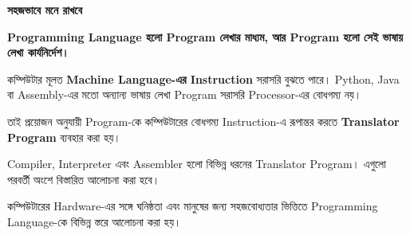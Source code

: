 \begin{rememberbox}

\textbf{\color{deepOrange}সহজভাবে মনে রাখবে}

\textbf{Programming Language হলো Program লেখার মাধ্যম, আর Program
হলো সেই ভাষায় লেখা কার্যনির্দেশ।}

\end{rememberbox}


কম্পিউটার মূলত \textbf{Machine Language-এর Instruction} সরাসরি
বুঝতে পারে। Python, Java বা Assembly-এর মতো অন্যান্য ভাষায় লেখা
Program সরাসরি Processor-এর বোধগম্য নয়।

তাই প্রয়োজন অনুযায়ী Program-কে কম্পিউটারের বোধগম্য Instruction-এ
রূপান্তর করতে \textbf{Translator Program} ব্যবহার করা হয়।

\begin{center}


\end{center}

Compiler, Interpreter এবং Assembler হলো বিভিন্ন ধরনের
Translator Program। এগুলো পরবর্তী অংশে বিস্তারিত আলোচনা করা হবে।


কম্পিউটারের Hardware-এর সঙ্গে ঘনিষ্ঠতা এবং মানুষের জন্য
সহজবোধ্যতার ভিত্তিতে Programming Language-কে বিভিন্ন স্তরে
আলোচনা করা হয়।

